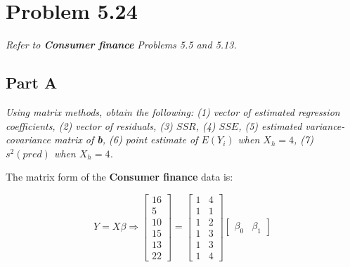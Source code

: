 \documentclass[12pt, letterpaper]{article}
\begin{document}
\newpage

\section{Problem 5.24}
\textit{Refer to \textbf{Consumer finance} Problems 5.5 and 5.13.}

\subsection{Part A}
\textit{Using matrix methods, obtain the following: (1) vector of estimated regression coefficients, (2) vector of residuals, (3) $SSR$, (4) $SSE$, (5) estimated variance-covariance matrix of \textbf{b}, (6) point estimate of $E(Y_{i})$ when $X_{h}=4$, (7) $s^{2}(pred)$ when $X_{h}=4$.}

The matrix form of the \textbf{Consumer finance} data is:

\begin{equation*}
Y = X\beta \Rightarrow
\begin{bmatrix}
16 \\ 5 \\ 10\\ 15\\ 13\\ 22
\end{bmatrix} =
\begin{bmatrix}
1 & 4\\ 1 & 1\\ 1 & 2\\ 1&3\\ 1&3\\ 1&4
\end{bmatrix}
\begin{bmatrix}
\beta_{0} & \beta_{1}
\end{bmatrix}
\end{equation*}
\end{document}
